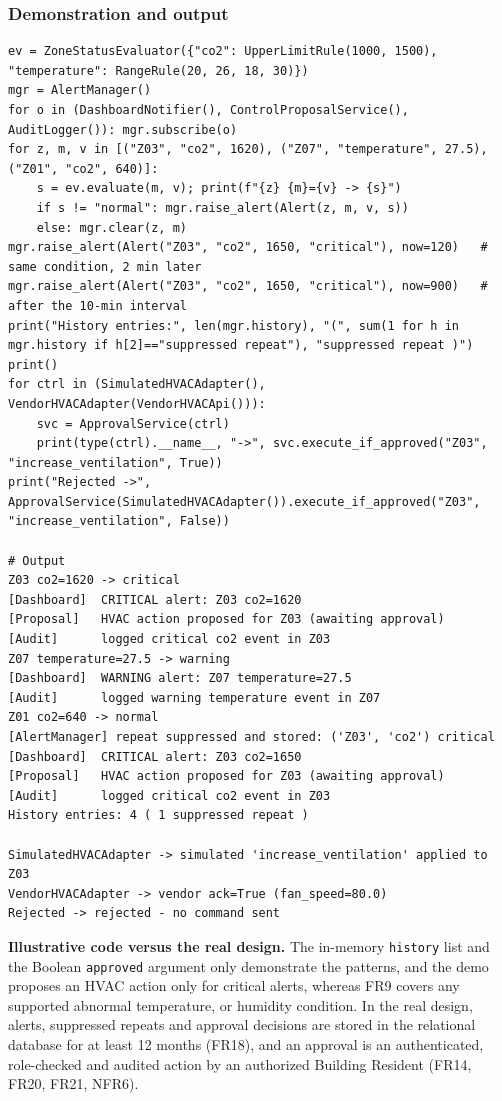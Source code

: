 \documentclass[11pt,a4paper]{article}
\newcommand{\code}[1]{\texttt{#1}}
\begin{document}
\subsubsection*{Demonstration and output}
\begin{lstlisting}
ev = ZoneStatusEvaluator({"co2": UpperLimitRule(1000, 1500), "temperature": RangeRule(20, 26, 18, 30)})
mgr = AlertManager()
for o in (DashboardNotifier(), ControlProposalService(), AuditLogger()): mgr.subscribe(o)
for z, m, v in [("Z03", "co2", 1620), ("Z07", "temperature", 27.5), ("Z01", "co2", 640)]:
    s = ev.evaluate(m, v); print(f"{z} {m}={v} -> {s}")
    if s != "normal": mgr.raise_alert(Alert(z, m, v, s))
    else: mgr.clear(z, m)
mgr.raise_alert(Alert("Z03", "co2", 1650, "critical"), now=120)   # same condition, 2 min later
mgr.raise_alert(Alert("Z03", "co2", 1650, "critical"), now=900)   # after the 10-min interval
print("History entries:", len(mgr.history), "(", sum(1 for h in mgr.history if h[2]=="suppressed repeat"), "suppressed repeat )")
print()
for ctrl in (SimulatedHVACAdapter(), VendorHVACAdapter(VendorHVACApi())):
    svc = ApprovalService(ctrl)
    print(type(ctrl).__name__, "->", svc.execute_if_approved("Z03", "increase_ventilation", True))
print("Rejected ->", ApprovalService(SimulatedHVACAdapter()).execute_if_approved("Z03", "increase_ventilation", False))

# Output
Z03 co2=1620 -> critical
[Dashboard]  CRITICAL alert: Z03 co2=1620
[Proposal]   HVAC action proposed for Z03 (awaiting approval)
[Audit]      logged critical co2 event in Z03
Z07 temperature=27.5 -> warning
[Dashboard]  WARNING alert: Z07 temperature=27.5
[Audit]      logged warning temperature event in Z07
Z01 co2=640 -> normal
[AlertManager] repeat suppressed and stored: ('Z03', 'co2') critical
[Dashboard]  CRITICAL alert: Z03 co2=1650
[Proposal]   HVAC action proposed for Z03 (awaiting approval)
[Audit]      logged critical co2 event in Z03
History entries: 4 ( 1 suppressed repeat )

SimulatedHVACAdapter -> simulated 'increase_ventilation' applied to Z03
VendorHVACAdapter -> vendor ack=True (fan_speed=80.0)
Rejected -> rejected - no command sent
\end{lstlisting}

\begin{zcallout}
\textbf{Illustrative code versus the real design.} The in-memory \code{history} list and the Boolean \code{approved} argument only demonstrate the patterns, and the demo proposes an HVAC action only for critical alerts, whereas FR9 covers any supported abnormal temperature, \COtwo{} or humidity condition. In the real design, alerts, suppressed repeats and approval decisions are stored in the relational database for at least 12 months (FR18), and an approval is an authenticated, role-checked and audited action by an authorized Building Resident (FR14, FR20, FR21, NFR6).
\end{zcallout}
\end{document}

